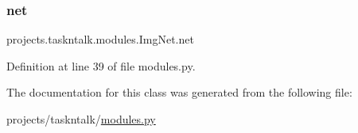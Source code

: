\subsubsection{\texorpdfstring{net}{net}}
{\footnotesize\ttfamily projects.\+taskntalk.\+modules.\+Img\+Net.\+net}



Definition at line 39 of file modules.\+py.



The documentation for this class was generated from the following file\+:\begin{DoxyCompactItemize}
\item 
projects/taskntalk/\hyperlink{projects_2taskntalk_2modules_8py}{modules.\+py}\end{DoxyCompactItemize}
